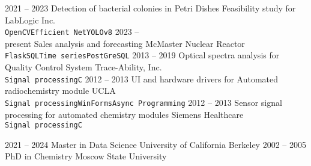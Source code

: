 \documentclass[9pt]{developercv} %
\begin{document}


\begin{entrylist}
	\entry
	{2021 -- 2023}
	{Detection of bacterial colonies in Petri Dishes}
	{Feasibility study for LabLogic Inc.}
	{\lorem\lorem\\ \texttt{OpenCV}\slashsep\texttt{Efficient Net}\slashsep\texttt{YOLOv8}}
	\entry
	{2023 -- \\\footnotesize{present}}
	{Sales analysis and forecasting}
	{McMaster Nuclear Reactor}
	{\lorem\lorem\\ \texttt{Flask}\slashsep\texttt{SQL}\slashsep\texttt{Time series}\slashsep\texttt{PostGreSQL}}
	\entry
	{2013 -- 2019}
	{Optical spectra analysis for Quality Control System}
	{Trace-Ability, Inc.}
	{\lorem\lorem\\ \texttt{Signal processing}\slashsep\texttt{C}}
	\entry
	{2012 -- 2013}
	{UI and hardware drivers for Automated radiochemistry module}
	{UCLA}
	{\lorem\lorem\\ \texttt{Signal processing}\slashsep\texttt{WinForms}\slashsep\texttt{Async Programming}}
	\entry
	{2012 -- 2013}
	{Sensor signal processing for automated chemistry modules}
	{Siemens Healthcare}
	{\lorem\lorem\\ \texttt{Signal processing}\slashsep\texttt{C}}
\end{entrylist}



\begin{entrylist}
	\entry
	{2021 -- 2024}
	{Master in Data Science}
	{University of California Berkeley}
	{\lorem\lorem}
	\entry
	{2002 -- 2005}
	{PhD in Chemistry}
	{Moscow State University}
	{\lorem\lorem}
\end{entrylist}


\end{document}
